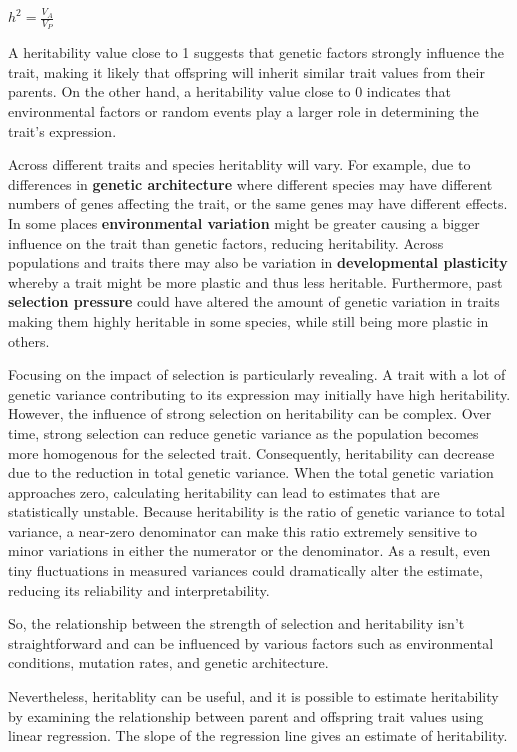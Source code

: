 \documentclass[
  a4paper]{book}
\begin{document}
\(h^2 = \frac{V_A}{V_P}\)

A heritability value close to 1 suggests that genetic factors strongly influence the trait, making it likely that offspring will inherit similar trait values from their parents. On the other hand, a heritability value close to 0 indicates that environmental factors or random events play a larger role in determining the trait's expression.

Across different traits and species heritablity will vary. For example, due to differences in \textbf{genetic architecture} where different species may have different numbers of genes affecting the trait, or the same genes may have different effects. In some places \textbf{environmental variation} might be greater causing a bigger influence on the trait than genetic factors, reducing heritability. Across populations and traits there may also be variation in \textbf{developmental plasticity} whereby a trait might be more plastic and thus less heritable. Furthermore, past \textbf{selection pressure} could have altered the amount of genetic variation in traits making them highly heritable in some species, while still being more plastic in others.

Focusing on the impact of selection is particularly revealing. A trait with a lot of genetic variance contributing to its expression may initially have high heritability. However, the influence of strong selection on heritability can be complex. Over time, strong selection can reduce genetic variance as the population becomes more homogenous for the selected trait. Consequently, heritability can decrease due to the reduction in total genetic variance. When the total genetic variation approaches zero, calculating heritability can lead to estimates that are statistically unstable. Because heritability is the ratio of genetic variance to total variance, a near-zero denominator can make this ratio extremely sensitive to minor variations in either the numerator or the denominator. As a result, even tiny fluctuations in measured variances could dramatically alter the estimate, reducing its reliability and interpretability.

So, the relationship between the strength of selection and heritability isn't straightforward and can be influenced by various factors such as environmental conditions, mutation rates, and genetic architecture.

Nevertheless, heritablity can be useful, and it is possible to estimate heritability by examining the relationship between parent and offspring trait values using linear regression. The slope of the regression line gives an estimate of heritability.
\end{document}
